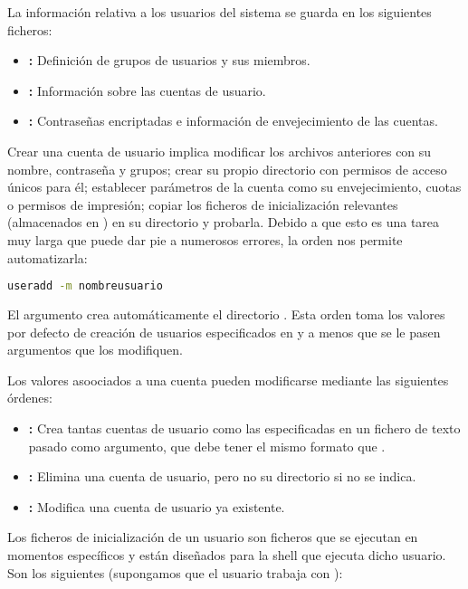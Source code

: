 La información relativa a los usuarios del sistema se guarda en los siguientes ficheros:

\begin{itemize}
	\item{}\textbf{:} Definición de grupos de usuarios y sus miembros.
	\item{}\textbf{:} Información sobre las cuentas de usuario.
	\item{}\textbf{:} Contraseñas encriptadas e información de envejecimiento de las cuentas.
\end{itemize}

Crear una cuenta de usuario implica modificar los archivos anteriores con su nombre, contraseña y grupos; crear su propio directorio  con permisos de acceso únicos para él; establecer parámetros de la cuenta como su envejecimiento, cuotas o permisos de impresión; copiar los ficheros de inicialización relevantes (almacenados en ) en su directorio  y probarla.
Debido a que esto es una tarea muy larga que puede dar pie a numerosos errores, la orden  nos permite automatizarla:

\begin{lstlisting}[language=Bash]
useradd -m nombreusuario
\end{lstlisting}

El argumento  crea automáticamente el directorio .
Esta orden toma los valores por defecto de creación de usuarios especificados en  y  a menos que se le pasen argumentos que los modifiquen.

Los valores asoociados a una cuenta pueden modificarse mediante las siguientes órdenes:

\begin{itemize}
	\item{}\textbf{:} Crea tantas cuentas de usuario como las especificadas en un fichero de texto pasado como argumento, que debe tener el mismo formato que .
	\item{}\textbf{:} Elimina una cuenta de usuario, pero no su directorio  si no se indica.
	\item{}\textbf{:} Modifica una cuenta de usuario ya existente.
\end{itemize}

Los ficheros de inicialización de un usuario son ficheros que se ejecutan en momentos específicos y están diseñados para la shell que ejecuta dicho usuario.
Son los siguientes (supongamos que el usuario trabaja con ):


